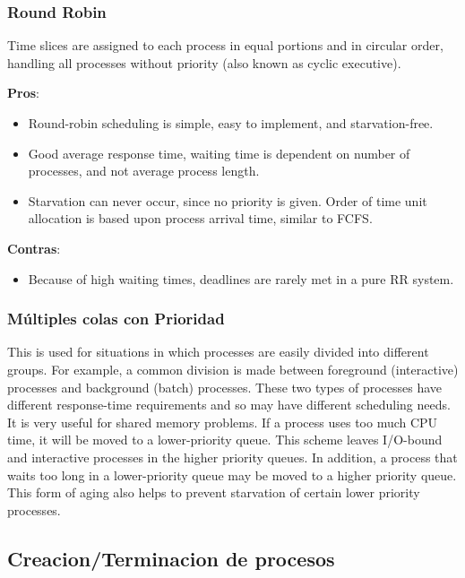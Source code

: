 \documentclass[a4paper, twoside]{article}
\begin{document}
\subsubsection{Round Robin}

Time slices are assigned to each process in equal portions and in circular
order, handling all processes without priority (also known as cyclic
executive). 

\textbf{Pros}:
\begin{itemize}
  \item Round-robin scheduling is simple, easy to implement, and
  starvation-free.
  \item Good average response time, waiting time is dependent on number of
  processes, and not average process length.
  \item Starvation can never occur, since no priority is given.
  Order of time unit allocation is based upon process arrival time,
  similar to FCFS.
\end{itemize}

\textbf{Contras}:
\begin{itemize}
  \item Because of high waiting times, deadlines are rarely met in a pure RR
  system.
\end{itemize}

\subsubsection{Múltiples colas con Prioridad}

This is used for situations in which processes are easily divided into
different groups.
For example, a common division is made between foreground (interactive)
processes and background (batch) processes.
These two types of processes have different response-time requirements and so
may have different scheduling needs.
It is very useful for shared memory problems.
If a process uses too much CPU time, it will be moved to a lower-priority
queue.
This scheme leaves I/O-bound and interactive processes in the higher priority
queues.
In addition, a process that waits too long in a lower-priority queue may be
moved to a higher priority queue.
This form of aging also helps to prevent starvation of certain lower priority
processes.

\subsection{Creacion/Terminacion de procesos}
\end{document}
